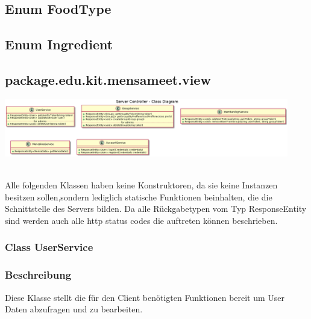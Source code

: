 \documentclass[a4paper]{scrreprt}
\begin{document}
\subsection{Enum FoodType}

\subsection{Enum Ingredient}



\subsection{package.edu.kit.mensameet.view}

\begin{center}
	\includegraphics[width=0.93\textwidth]{Klassendiagramme/serverViewCD.png}
\end{center}


\\Alle folgenden Klassen haben keine Konstruktoren, da sie keine Instanzen besitzen sollen,sondern lediglich statische Funktionen beinhalten, die die Schnittstelle des Servers bilden. Da alle Rückgabetypen vom Typ ResponseEntity sind werden auch alle http status codes die auftreten können beschrieben.

\subsubsection{Class UserService}
\subsubsection*{Beschreibung}
Diese Klasse stellt die für den Client benötigten Funktionen bereit um User Daten abzufragen und zu bearbeiten. 
\end{document}
